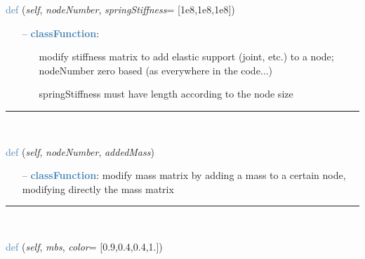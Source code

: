 \begin{itemize}[leftmargin=1.4cm]
\begin{itemize}[leftmargin=1.4cm]
\begin{itemize}[leftmargin=1.4cm]
\begin{itemize}[leftmargin=0.5cm]
\begin{itemize}[leftmargin=1.4cm]
\begin{itemize}[leftmargin=1.4cm]
\begin{itemize}[leftmargin=0.5cm]
\begin{flushleft}
\noindent \textcolor{steelblue}{def {\bf {}}}\label{sec:FEM:FEMinterface:AddElasticSupportAtNode}
({\it self}, {\it nodeNumber}, {\it springStiffness}= [1e8,1e8,1e8])
\end{flushleft}
\setlength{\itemindent}{0.7cm}
\begin{itemize}[leftmargin=0.7cm]
\item[--]\textcolor{steelblue}{\bf classFunction}: \vspace{-6pt}
\begin{itemize}[leftmargin=1.2cm]
\setlength{\itemindent}{-0.7cm}
\item[]modify stiffness matrix to add elastic support (joint, etc.) to a node; nodeNumber zero based (as everywhere in the code...)
\item[]springStiffness must have length according to the node size
\end{itemize}
\vspace{12pt}\end{itemize}
%
\noindent\rule{8cm}{0.75pt}\vspace{1pt} \\ 
\begin{flushleft}
\noindent \textcolor{steelblue}{def {\bf {}}}\label{sec:FEM:FEMinterface:AddNodeMass}
({\it self}, {\it nodeNumber}, {\it addedMass})
\end{flushleft}
\setlength{\itemindent}{0.7cm}
\begin{itemize}[leftmargin=0.7cm]
\item[--]\textcolor{steelblue}{\bf classFunction}: modify mass matrix by adding a mass to a certain node, modifying directly the mass matrix
\vspace{12pt}\end{itemize}
%
\noindent\rule{8cm}{0.75pt}\vspace{1pt} \\ 
\begin{flushleft}
\noindent \textcolor{steelblue}{def {\bf {}}}\label{sec:FEM:FEMinterface:CreateLinearFEMObjectGenericODE2}
({\it self}, {\it mbs}, {\it color}= [0.9,0.4,0.4,1.])
\end{flushleft}
\setlength{\itemindent}{0.7cm}

\end{itemize}
\end{itemize}
\end{itemize}
\end{itemize}
\end{itemize}
\end{itemize}
\end{itemize}
